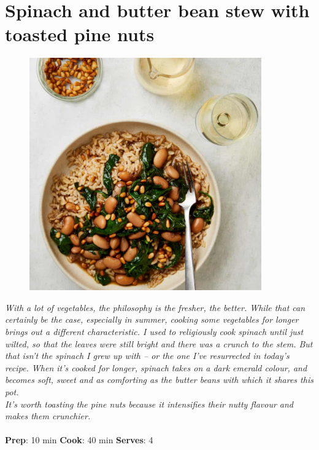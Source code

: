 \documentclass{book}
\begin{document}
\section{Spinach and butter bean stew with toasted pine nuts}
\begin{figure}
\centering\includegraphics[width=10cm,height=10cm,keepaspectratio]{Recipe_Pictures/Spinach_and_butter_bean_stew_with_toasted_pine_nuts.png}
\end{figure}
\emph{With a lot of vegetables, the philosophy is the fresher, the better. While that can certainly be the case, especially in summer, cooking some vegetables for longer brings out a different characteristic. I used to religiously cook spinach until just wilted, so that the leaves were still bright and there was a crunch to the stem. But that isn’t the spinach I grew up with – or the one I’ve resurrected in today’s recipe. When it’s cooked for longer, spinach takes on a dark emerald colour, and becomes soft, sweet and as comforting as the butter beans with which it shares this pot.\\ 
It’s worth toasting the pine nuts because it intensifies their nutty flavour and makes them crunchier.}\\\\ 
\textbf{Prep}: 10 min
\textbf{Cook}: 40 min
\textbf{Serves}: 4
\end{document}
